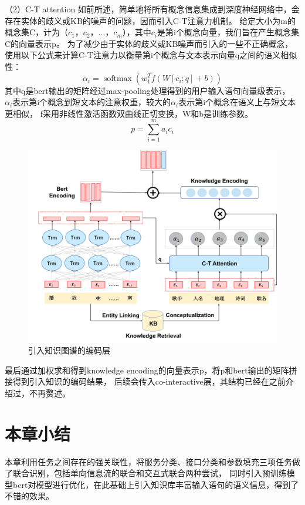 （2）C-T attention
如前所述，简单地将所有概念信息集成到深度神经网络中，会存在实体的歧义或KB的噪声的问题，因而引入C-T注意力机制。
给定大小为m的概念集C，计为（$c_1$，$c_2$，$\dots$，$c_m$），其中$c_i$是第i个概念向量，我们旨在产生概念集C的向量表示p。 
为了减少由于实体的歧义或KB噪声而引入的一些不正确概念，使用以下公式来计算C-T注意力以衡量第i个概念与文本表示向量q之间的语义相似性：
\begin{equation}
\alpha_{i}=\operatorname{softmax}\left(w_{1}^{T} f\left(W\left[c_{i} ; q\right]+b\right)\right)
\end{equation}
其中q是bert输出的矩阵经过max-pooling处理得到的用户输入语句向量级表示，
$\alpha_{i}$表示第i个概念到短文本的注意权重，较大的$\alpha_{i}$表示第i个概念在语义上与短文本更相似，
f采用非线性激活函数双曲线正切变换，W和b是训练参数。
\begin{equation}
p=\sum_{i=1}^{m} a_{i} c_{i}
\end{equation}
\begin{figure}[htbp]
  \centering
  \includegraphics[width=13cm]{./images/kg.png}
  \caption{引入知识图谱的编码层}
  \label{fig:kg}
\end{figure}
最后通过加权求和得到knowledge encoding的向量表示p，将p和bert输出的矩阵拼接得到引入知识的编码结果，
后续会传入co-interactive层，其结构已经在之前介绍过，不再赘述。

\section{本章小结}
本章利用任务之间存在的强关联性，将服务分类、接口分类和参数填充三项任务做了联合识别，包括单向信息流的联合和交互式联合两种尝试，
同时引入预训练模型bert对模型进行优化，在此基础上引入知识库丰富输入语句的语义信息，得到了不错的效果。

